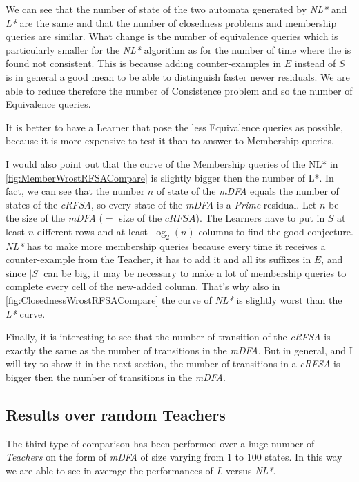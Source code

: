 We can see that the number of state of the two automata generated by \textit{NL*} and \textit{L*} are the same and that the number of closedness problems and membership queries are similar. What change is the number of equivalence queries which is particularly smaller for the \textit{NL*} algorithm as for the number of time where the \OT is found not consistent. This is because adding counter-examples in $E$ instead of $S$ is in general a good mean to be able to distinguish faster newer residuals. We are able to reduce therefore the number of Consistence problem and so the number of Equivalence queries.

\begin{remark}
  It is better to have a Learner that pose the less Equivalence queries as possible, because it is more expensive to test it than to answer to Membership queries.
\end{remark}

I would also point out that the curve of the Membership queries of the NL* in \cref{fig:MemberWrostRFSACompare} is slightly bigger then the number of L*. In fact, we can see that the number $n$ of state of the \textit{mDFA} equals the number of states of the \textit{cRFSA}, so every state of the \textit{mDFA} is a \textit{Prime} residual. Let $n$ be the size of the \textit{mDFA} ($=$ size of the $\textit{cRFSA}$). The Learners have to put in $S$ at least $n$ different rows and at least $\log_2(n)$ columns to find the good conjecture. \textit{NL*} has to make more membership queries because every time it receives a counter-example from the Teacher, it has to add it and all its suffixes in $E$, and since $|S|$ can be big, it may be necessary to make a lot of membership queries to complete every cell of the new-added column. That's why also in \cref{fig:ClosednessWrostRFSACompare} the curve of \textit{NL*} is slightly worst than the \textit{L*} curve.

Finally, it is interesting to see that the number of transition of the \textit{cRFSA} is exactly the same as the number of transitions in the \textit{mDFA}. But in general, and I will try to show it in the next section, the number of transitions in a \textit{cRFSA} is bigger then the number of transitions in the \textit{mDFA}.

\subsection{Results over random Teachers}

The third type of comparison has been performed over a huge number of \textit{Teachers} on the form of \textit{mDFA} of size varying from $1$ to $100$ states. In this way we are able to see in average the performances of \textit{L} versus \textit{NL*}.


